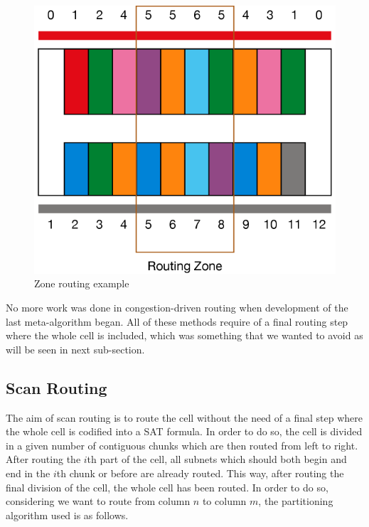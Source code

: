 \begin{figure}[h!]
  \centering
  \includegraphics[scale=0.5]{img/design/congestionzone.png}
  \caption{Zone routing example}
  \label{fig:congestionzone}
\end{figure} 

No more work was done in congestion-driven routing when development of the last meta-algorithm began. All of these methods require of a final routing step where the whole cell is included, which was something that we wanted to avoid as will be seen in next sub-section. \\



\subsection{Scan Routing}

The aim of scan routing is to route the cell without the need of a final step where the whole cell is codified into a SAT formula. In order to do so, the cell is divided in a given number of contiguous chunks which are then routed from left to right. After routing the $i$th part of the cell, all subnets which should both begin and end in the $i$th chunk or before are already routed. This way, after routing the final division of the cell, the whole cell has been routed. In order to do so, considering we want to route from column $n$ to column $m$, the partitioning algorithm used is as follows. \\

